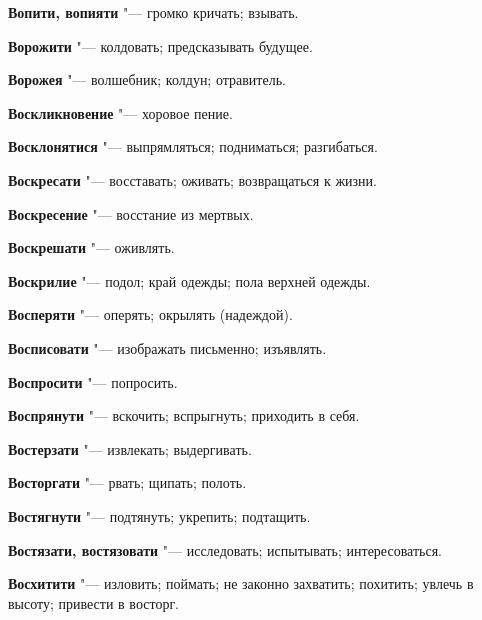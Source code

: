 \begin{mymulticols}{2}
\noindent\textbf{Вопити, вопияти} "--- громко кричать; взывать. 




\noindent\textbf{Ворожити} "--- колдовать; предсказывать будущее. 




\noindent\textbf{Ворожея} "--- волшебник; колдун; отравитель. 




\noindent\textbf{Воскликновение} "--- хоровое пение. 




\noindent\textbf{Восклонятися} "--- выпрямляться; подниматься; разгибаться. 




\noindent\textbf{Воскресати} "--- восставать; оживать; возвращаться к жизни. 




\noindent\textbf{Воскресение} "--- восстание из мертвых. 




\noindent\textbf{Воскрешати} "--- оживлять. 




\noindent\textbf{Воскрилие} "--- подол; край одежды; пола верхней одежды. 




\noindent\textbf{Восперяти} "--- оперять; окрылять (надеждой). 




\noindent\textbf{Восписовати} "--- изображать письменно; изъявлять. 




\noindent\textbf{Воспросити} "--- попросить. 




\noindent\textbf{Воспрянути} "--- вскочить; вспрыгнуть; приходить в себя. 




\noindent\textbf{Востерзати} "--- извлекать; выдергивать. 




\noindent\textbf{Восторгати} "--- рвать; щипать; полоть. 




\noindent\textbf{Востягнути} "--- подтянуть; укрепить; подтащить. 




\noindent\textbf{Востязати, востязовати} "--- исследовать; испытывать; интересоваться. 




\noindent\textbf{Восхитити} "--- изловить; поймать; не законно захватить; похитить; увлечь в высоту; привести в восторг. 





\end{mymulticols}
